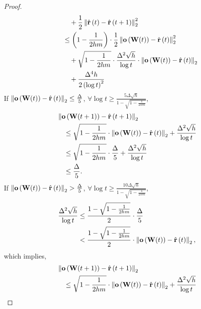 \begin{proof}
\begin{equation*}
\begin{split}
    &\qquad + \frac{1}{2} \left\| \hat{{\mathbf{r}}}\left(t\right) - \hat{{\mathbf{r}}}\left(t+1\right) \right\|_2^2 \\
    &\quad \le \left( 1 - \frac{1}{2 h m } \right) \cdot \frac{1}{2} \left\| {\mathbf{o}}\left( {\mathbf{W}}(t) \right) - \hat{{\mathbf{r}}}\left(t\right)\right\|_2^2 \\
    &\qquad + \sqrt{1 - \frac{1}{2 h m } } \cdot \frac{\Delta^2 \sqrt{h}}{\log{t}} \cdot \left\| {\mathbf{o}}\left( {\mathbf{W}}(t) \right) - \hat{{\mathbf{r}}}\left(t\right)\right\|_2 \\
    &\qquad + \frac{\Delta^4 h}{2 \left( \log{t} \right)^2 }
\end{split}
\end{equation*}
If $\left\| {\mathbf{o}}\left( {\mathbf{W}}(t) \right) - \hat{{\mathbf{r}}}\left(t\right)\right\|_2 \le \frac{\Delta}{5}$, $\forall \log{t} \ge \frac{5 \Delta \sqrt{h}}{1 - \sqrt{1 - \frac{1}{2 h m}}}$,
\begin{equation*}
\begin{split}
    &\left\| {\mathbf{o}}\left( {\mathbf{W}}(t+1) \right) - \hat{{\mathbf{r}}}\left(t+1\right)\right\|_2 \\
    &\quad \le \sqrt{1 - \frac{1}{2 h m}} \cdot \left\| {\mathbf{o}}\left( {\mathbf{W}}(t) \right) - \hat{{\mathbf{r}}}\left(t\right)\right\|_2 + \frac{\Delta^2 \sqrt{h}}{\log{t}} \\
    &\quad \le \sqrt{1 - \frac{1}{2 h m}} \cdot \frac{\Delta}{5} + \frac{\Delta^2 \sqrt{h}}{\log{t}} \\
    &\quad \le \frac{\Delta}{5}.
\end{split}
\end{equation*}
If $\left\| {\mathbf{o}}\left( {\mathbf{W}}(t) \right) - \hat{{\mathbf{r}}}\left(t\right)\right\|_2 > \frac{\Delta}{5}$, $\forall \log{t} \ge \frac{10 \Delta \sqrt{h}}{1 - \sqrt{1 - \frac{1}{2 h m}}}$,
\begin{equation*}
\begin{split}
    \frac{\Delta^2 \sqrt{h}}{\log{t}} &\le \frac{1 - \sqrt{1 - \frac{1}{2 h m}}}{2} \cdot \frac{\Delta}{5} \\
    &< \frac{1 - \sqrt{1 - \frac{1}{2 h m}}}{2} \cdot \left\| {\mathbf{o}}\left( {\mathbf{W}}(t) \right) - \hat{{\mathbf{r}}}\left(t\right)\right\|_2,
\end{split}
\end{equation*}
which implies,
\begin{equation*}
\begin{split}
    &\left\| \rvo\left( \rmW(t+1) \right) - \hat{\rvr}\left(t+1\right)\right\|_2 \\
    &\quad \le \sqrt{1 - \frac{1}{2 h m}} \cdot \left\| \rvo\left( \rmW(t) \right) - \hat{\rvr}\left(t\right)\right\|_2 + \frac{\Delta^2 \sqrt{h}}{\log{t}} \\

\end{split}
\end{equation*}
\end{proof}
